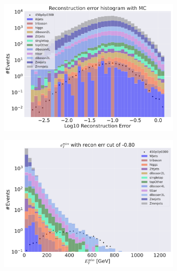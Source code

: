 \begin{figure}[H]
    \centering
    \begin{subfigure}{.40\textwidth}
        \includegraphics[width=\textwidth]{Figures/VAE_testing/small/3lep/b_data_recon_big_rm3_feats_sig_450p0p0300.pdf}
        \caption{ }
        \label{fig:VAE_3lep_small_450_2}
    \end{subfigure}
    \hfill
    \begin{subfigure}{.40\textwidth}
        \includegraphics[width=\textwidth]{Figures/VAE_testing/small/3lep/b_data_recon_big_rm3_feats_sig_450p0p0300_etmiss_recon_errcut_-0.80.pdf}
        \caption{}
        \label{fig:VAE_3lep_small_etmiss_450_2}
    \end{subfigure}

\end{figure}

